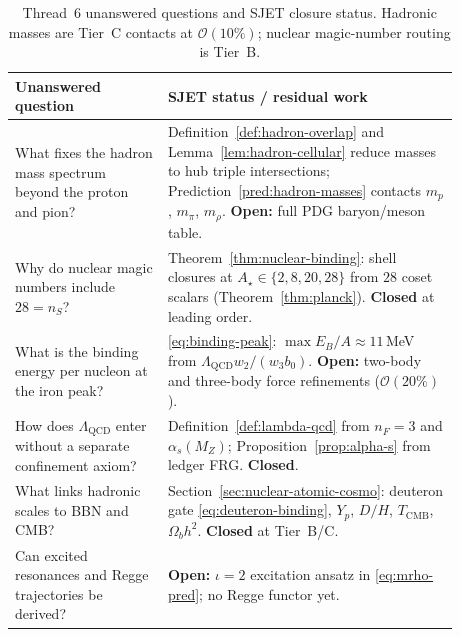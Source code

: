 \begin{table}[ht]
\centering
\small
\renewcommand{\arraystretch}{1.12}
\begin{tabular}{@{}p{0.30\linewidth}p{0.58\linewidth}@{}}
\toprule
\textbf{Unanswered question} & \textbf{SJET status / residual work} \\
\midrule
What fixes the hadron mass spectrum beyond the proton and pion? &
  Definition~\ref{def:hadron-overlap} and
  Lemma~\ref{lem:hadron-cellular} reduce masses to hub triple
  intersections; Prediction~\ref{pred:hadron-masses} contacts
  $m_p$, $m_\pi$, $m_\rho$. \textbf{Open:} full PDG baryon/meson table. \\
\addlinespace
Why do nuclear magic numbers include $28=n_S$? &
  Theorem~\ref{thm:nuclear-binding}: shell closures at
  $A_\star\in\{2,8,20,28\}$ from $28$ coset scalars
  (Theorem~\ref{thm:planck}). \textbf{Closed} at leading order. \\
\addlinespace
What is the binding energy per nucleon at the iron peak? &
  \eqref{eq:binding-peak}: $\max E_B/A\approx 11$\,MeV from
  $\Lambda_{\mathrm{QCD}}w_2/(w_3 b_0)$. \textbf{Open:} two-body and
  three-body force refinements ($\mathcal{O}(20\%)$). \\
\addlinespace
How does $\Lambda_{\mathrm{QCD}}$ enter without a separate confinement axiom? &
  Definition~\ref{def:lambda-qcd} from $n_F=3$ and $\alpha_s(M_Z)$;
  Proposition~\ref{prop:alpha-s} from ledger FRG. \textbf{Closed}. \\
\addlinespace
What links hadronic scales to BBN and CMB? &
  Section~\ref{sec:nuclear-atomic-cosmo}: deuteron gate
  \eqref{eq:deuteron-binding}, $Y_p$, $D/H$, $T_{\mathrm{CMB}}$,
  $\Omega_b h^2$. \textbf{Closed} at Tier~B/C. \\
\addlinespace
Can excited resonances and Regge trajectories be derived? &
  \textbf{Open:} $\iota=2$ excitation ansatz in \eqref{eq:mrho-pred};
  no Regge functor yet. \\
\bottomrule
\end{tabular}
\caption{Thread~6 unanswered questions and SJET closure status. Hadronic
masses are Tier~C contacts at $\mathcal{O}(10\%)$; nuclear magic-number
routing is Tier~B.}
\label{tab:thread6-questions}
\end{table}

